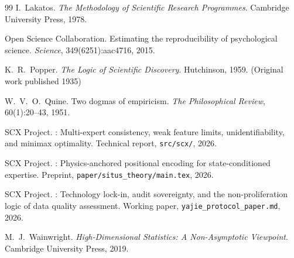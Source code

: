\documentclass[11pt,a4paper]{article}
\theoremstyle{remark}
\begin{document}
\begin{thebibliography}{99}
I.~Lakatos.
\newblock \emph{The Methodology of Scientific Research Programmes}.
\newblock Cambridge University Press, 1978.

Open Science Collaboration.
\newblock Estimating the reproducibility of psychological science.
\newblock \emph{Science}, 349(6251):aac4716, 2015.

K.~R.~Popper.
\newblock \emph{The Logic of Scientific Discovery}.
\newblock Hutchinson, 1959. (Original work published 1935)

W.~V.~O.~Quine.
\newblock Two dogmas of empiricism.
\newblock \emph{The Philosophical Review}, 60(1):20--43, 1951.

SCX Project.
: Multi-expert consistency, weak feature limits, unidentifiability,
  and minimax optimality.
\newblock Technical report, \texttt{src/scx/}, 2026.

SCX Project.
: Physics-anchored positional encoding for state-conditioned expertise.
\newblock Preprint, \texttt{paper/situs\_theory/main.tex}, 2026.

SCX Project.
: Technology lock-in, audit sovereignty, and the
  non-proliferation logic of data quality assessment.
\newblock Working paper, \texttt{yajie\_protocol\_paper.md}, 2026.

M.~J.~Wainwright.
\newblock \emph{High-Dimensional Statistics: A Non-Asymptotic Viewpoint}.
\newblock Cambridge University Press, 2019.

\end{thebibliography}
\end{document}
